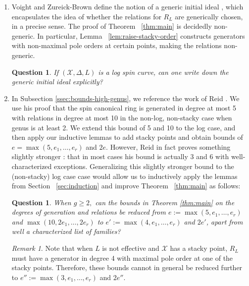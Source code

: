 \documentclass{amsart}
\theoremstyle{plain}
\newtheorem{question}[thm]{Question}
\theoremstyle{definition}
\theoremstyle{remark}
\newtheorem{rem}[thm]{Remark}
\numberwithin{equation}{section}
\newcommand\sx{\mathscr X}
\newcommand{\halfcan}{L}
\begin{document}
\begin{enumerate}
	\item Voight and Zureick-Brown define
		the notion of a generic initial ideal \cite[Definition 2.2.7]{vzb:stacky}, which 
		encapsulates the idea of whether the relations for $R_\halfcan$ are 
		generically chosen, in a precise sense. 
		The proof of Theorem
		~\ref{thm:main} is decidedly non-generic. 
		In particular, Lemma ~\ref{lem:raise-stacky-order} 
		constructs generators with non-maximal pole orders at certain 
		points, making the relations non-generic. 
		\begin{question}
		\label{ques:generic-initial}
			If $(\sx, \Delta, \halfcan)$ is a log spin curve, can one write down the
			generic initial ideal explicitly?
		\end{question}
	\item In Subsection \ref{ssec:bounds-high-genus}, we reference 
		the work of Reid \cite[Theorem 3.4]{reid:infinitesimal}. We use his 
		proof that the 
		spin canonical ring is generated in degree at most 5 with
		relations in degree at most 10 in the 			
		non-log, non-stacky case when genus is at least 2. We extend this 
		bound of 5 and 10 to the log case, and then apply our inductive 
		lemmas to add stacky points and obtain bounds of $e = \max(5,e_1, \ldots, e_r)$ and $2e$.  However, Reid in fact proves something slightly stronger \cite[Theorem 3.4]{reid:infinitesimal}: that in 
		most cases his bound is actually 3 and 6 with well-characterized 
		exceptions.
		Generalizing this slightly stronger bound to the (non-stacky) log case case would allow us to inductively apply the lemmas from Section ~\ref{sec:induction} and improve Theorem ~\ref{thm:main} as follows:
		\begin{question}\label{ques:reduce-5,10-to-4,8}
			When $g \geq 2,$ can the bounds in Theorem \ref{thm:main} on 
			the degrees of generation and relations be reduced from 
			$e := \max(5, e_1, \ldots, e_r)$ and $\max(10, 2e_1, \ldots, 2e_r)$ to 
			$e' := \max(4, e_1, \ldots, e_r)$ and $2e'$, 
			apart from well a characterized list of families?
		\end{question}
		\begin{rem}\label{rem:reduce-3,6}
			Note that when $L$ is not effective and $\sx$ has a stacky point, $R_L$ must have a generator in degree 4 with maximal pole order at one of the stacky points.  Therefore, these bounds cannot in general be reduced further to 
			$e'' := \max(3, e_1, \ldots, e_r)$ and $2e''$.

\end{rem}
\end{enumerate}
\end{document}
